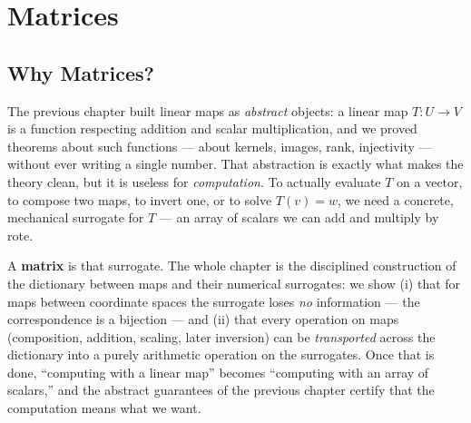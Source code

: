 
\newpage
\section{Matrices}
\label{sec:matrices}

\subsection{Why Matrices?}

\begin{intuition}
    The previous chapter built linear maps as \emph{abstract} objects: a linear map $T : U \to V$ is a
    function respecting addition and scalar multiplication, and we proved theorems about such functions
    --- about kernels, images, rank, injectivity --- without ever writing a single number. That
    abstraction is exactly what makes the theory clean, but it is useless for \emph{computation}. To
    actually evaluate $T$ on a vector, to compose two maps, to invert one, or to solve $T(v) = w$, we
    need a concrete, mechanical surrogate for $T$ --- an array of scalars we can add and multiply by
    rote.

    A \textbf{matrix} is that surrogate. The whole chapter is the disciplined construction of the
    dictionary between maps and their numerical surrogates: we show (i) that for maps between
    coordinate spaces the surrogate loses \emph{no} information --- the correspondence is a bijection
    --- and (ii) that every operation on maps (composition, addition, scaling, later inversion) can be
    \emph{transported} across the dictionary into a purely arithmetic operation on the surrogates. Once
    that is done, ``computing with a linear map'' becomes ``computing with an array of scalars,'' and
    the abstract guarantees of the previous chapter certify that the computation means what we want.
\end{intuition}

